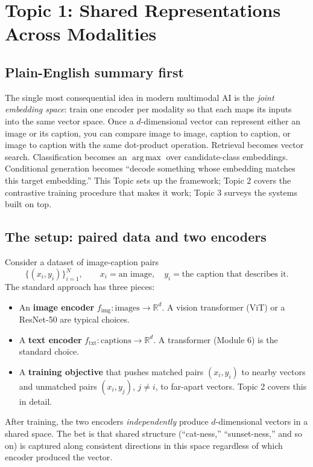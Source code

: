 \documentclass[11pt]{article}
\newcommand{\R}{\mathbb{R}}
\DeclareMathOperator*{\argmax}{arg\,max}
\theoremstyle{remark}
\newcommand{\fimg}{f_{\text{img}}}
\newcommand{\ftxt}{f_{\text{txt}}}
\begin{document}
\section{Topic 1: Shared Representations Across Modalities}

\subsection*{Plain-English summary first}
The single most consequential idea in modern multimodal AI is the \emph{joint embedding space}: train one encoder per modality so that each maps its inputs into the same vector space. Once a $d$-dimensional vector can represent either an image or its caption, you can compare image to image, caption to caption, or image to caption with the same dot-product operation. Retrieval becomes vector search. Classification becomes an $\argmax$ over candidate-class embeddings. Conditional generation becomes ``decode something whose embedding matches this target embedding.'' This Topic sets up the framework; Topic 2 covers the contrastive training procedure that makes it work; Topic 3 surveys the systems built on top.

\subsection{The setup: paired data and two encoders}
Consider a dataset of image-caption pairs
\[
\{(x_i, y_i)\}_{i=1}^{N}, \qquad x_i = \text{an image},\quad y_i = \text{the caption that describes it}.
\]
The standard approach has three pieces:
\begin{itemize}[leftmargin=1.4em]
  \item An \textbf{image encoder} $\fimg : \text{images} \to \R^d$. A vision transformer (ViT) or a ResNet-50 are typical choices.
  \item A \textbf{text encoder} $\ftxt : \text{captions} \to \R^d$. A transformer (Module 6) is the standard choice.
  \item A \textbf{training objective} that pushes matched pairs $(x_i, y_i)$ to nearby vectors and unmatched pairs $(x_i, y_j)$, $j \neq i$, to far-apart vectors. Topic 2 covers this in detail.
\end{itemize}
After training, the two encoders \emph{independently} produce $d$-dimensional vectors in a shared space. The bet is that shared structure (``cat-ness,'' ``sunset-ness,'' and so on) is captured along consistent directions in this space regardless of which encoder produced the vector.
\end{document}

